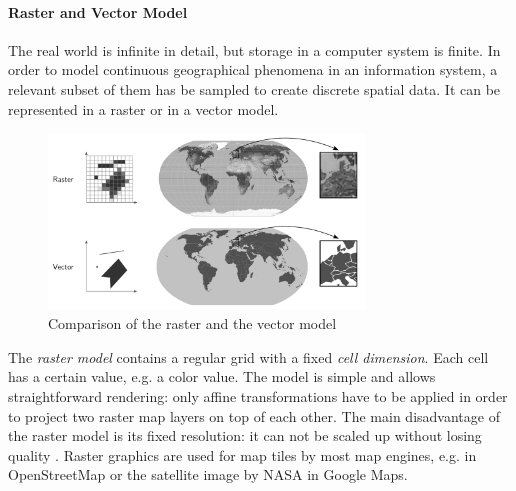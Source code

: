 
\paragraph{Raster and Vector Model} %
\label{ssub:raster_vs_vector_model}

The real world is infinite in detail, but storage in a computer system is finite. In order to model continuous geographical phenomena in an information system, a relevant subset of them has be sampled to create discrete spatial data. It can be represented in a raster or in a vector model.

\begin{figure}[H]
  \centering
  \includegraphics[width=0.75\textwidth]{graphics/basics/raster_vector}
  \caption{Comparison of the raster and the vector model}
  \label{fig:raster_vector}
\end{figure}

The \emph{raster model} contains a regular grid with a fixed \emph{cell dimension}. Each cell has a certain value, e.g. a color value.
The model is simple and allows straightforward rendering: only affine transformations have to be applied in order to project two raster map layers on top of each other. The main disadvantage of the raster model is its fixed resolution: it can not be scaled up without losing quality
\cite[pp.42-48]{bolstad2008gis}.
Raster graphics are used for map tiles by most map engines, e.g. in OpenStreetMap or the satellite image by NASA in Google Maps.

